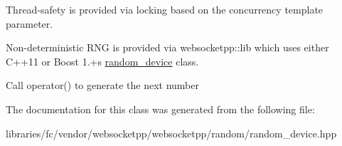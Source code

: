 Thread-\/safety is provided via locking based on the concurrency template parameter.

Non-\/deterministic R\+NG is provided via websocketpp\+::lib which uses either C++11 or Boost 1.+\textquotesingle{}s \mbox{\hyperlink{namespacewebsocketpp_1_1random_1_1random__device}{random\+\_\+device}} class.

Call operator() to generate the next number 

The documentation for this class was generated from the following file\+:\begin{DoxyCompactItemize}
\item 
libraries/fc/vendor/websocketpp/websocketpp/random/random\+\_\+device.\+hpp\end{DoxyCompactItemize}
